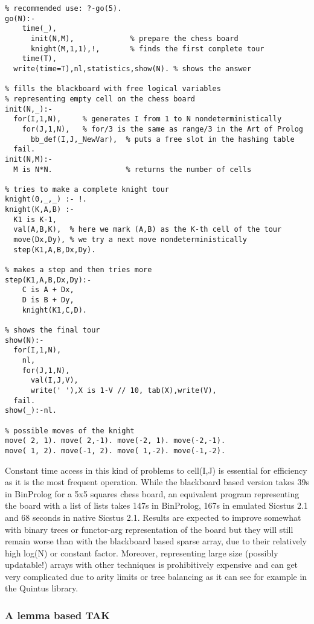 \documentclass{article}
\begin{document}
\begin{verbatim}
% recommended use: ?-go(5).
go(N):-
	time(_),
	  init(N,M),             % prepare the chess board
	  knight(M,1,1),!,       % finds the first complete tour
	time(T),
  write(time=T),nl,statistics,show(N). % shows the answer

% fills the blackboard with free logical variables
% representing empty cell on the chess board
init(N,_):-
  for(I,1,N),     % generates I from 1 to N nondeterministically
    for(J,1,N),   % for/3 is the same as range/3 in the Art of Prolog
      bb_def(I,J,_NewVar),  % puts a free slot in the hashing table
  fail.
init(N,M):-
  M is N*N.                 % returns the number of cells

% tries to make a complete knight tour
knight(0,_,_) :- !.
knight(K,A,B) :-
  K1 is K-1,
  val(A,B,K),  % here we mark (A,B) as the K-th cell of the tour
  move(Dx,Dy), % we try a next move nondeterministically
  step(K1,A,B,Dx,Dy).

% makes a step and then tries more
step(K1,A,B,Dx,Dy):-
    C is A + Dx,
    D is B + Dy,
    knight(K1,C,D).

% shows the final tour
show(N):-
  for(I,1,N),
    nl,
    for(J,1,N),
      val(I,J,V),
      write(' '),X is 1-V // 10, tab(X),write(V),
  fail.
show(_):-nl.

% possible moves of the knight
move( 2, 1). move( 2,-1). move(-2, 1). move(-2,-1).
move( 1, 2). move(-1, 2). move( 1,-2). move(-1,-2).
\end{verbatim}

Constant time access in this kind of problems to cell(I,J) is essential for
efficiency as it is the most frequent operation.
While the blackboard based version takes 39s in BinProlog for a 5x5 squares chess board, an equivalent program representing the board with a list of lists takes 147s in BinProlog, 167s in emulated Sicstus 2.1 and 68 seconds in native Sicstus 2.1. Results are expected to improve somewhat with binary trees or functor-arg representation of the board but they will still remain worse than with the blackboard based sparse array, due to their relatively high log(N) or constant factor. Moreover, representing large size (possibly updatable!) arrays with other techniques is prohibitively expensive and can get very complicated due to arity limits or tree balancing as it can see for example in the Quintus library.

\subsubsection{A lemma based TAK}
\end{document}
